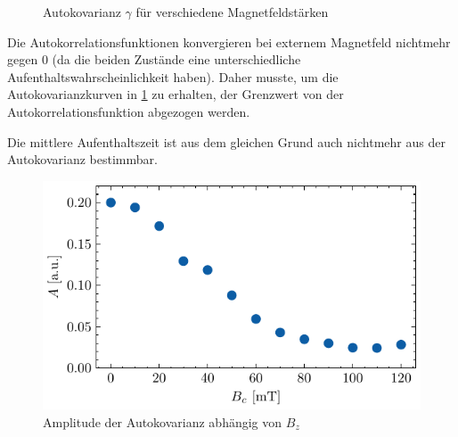 \documentclass[main.tex]{subfiles}
\begin{document}
\begin{figure}[H]
    \caption{Autokovarianz $\gamma$ für verschiedene Magnetfeldstärken }\label{fig:bc-autocov}
\end{figure}

Die Autokorrelationsfunktionen konvergieren bei externem Magnetfeld nichtmehr gegen \num{0} (da die beiden Zustände eine unterschiedliche Aufenthaltswahrscheinlichkeit haben). Daher musste, um die Autokovarianzkurven in \cref{fig:bc-autocov} zu erhalten, der Grenzwert von der Autokorrelationsfunktion abgezogen werden.

Die mittlere Aufenthaltszeit ist aus dem gleichen Grund auch nichtmehr aus der Autokovarianz bestimmbar. 





\begin{figure}[H]
    \centering
    \includegraphics{bilder/plots/max_Bz/rauschamplitude.pdf}
    \caption{Amplitude der Autokovarianz abhängig von \(B_z\)}\label{fig:bc-rauschampl}
\end{figure}
\end{document}
